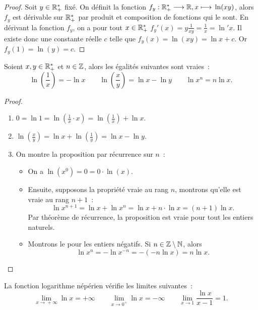 \begin{proof}
  Soit \(y \in \mathbb{R}_{+}^{*}\) fixé. On définit la fonction
  \(f_y:\mathbb{R}_{+}^{*} \longrightarrow{} \mathbb{R}, x \longmapsto{} \ln(xy)\), alors \(f_y\) est dérivable
  sur \(\mathbb{R}_{+}^{*}\) par produit et composition de fonctions qui le sont. En
  dérivant la fonction \(f_y\), on a pour tout \(x \in \mathbb{R}_{+}^{*}\) \(f_y'(x)
  = y \frac{1}{xy} = \frac{1}{x} = \ln' x\).
  Il existe donc une constante réelle \(c\) telle que \(f_y(x) = \ln(xy) = \ln x
  + c\). Or \(f_y(1) = \ln(y) = c\).
\end{proof}

\begin{corth}
  Soient \(x, y \in \mathbb{R}_{+}^{*}\) et \(n \in \mathbb{Z}\), alors les égalités suivantes
  sont vraies~:
  \begin{equation}
    \ln \left(\frac{1}{x}\right) = -\ln x \qquad \ln \left(\frac{x}{y}\right) =
    \ln x - \ln y \qquad \ln x^n = n\ln x.
  \end{equation}
\end{corth}

\begin{proof}
  \begin{enumerate}
    \item \( 0 = \ln 1 = \ln \left(\frac{1}{x} \cdot x \right) = \ln
      \left(\frac{1}{x}\right) + \ln x \).
    \item \( \ln \left(\frac{x}{y}\right) = \ln x + \ln \left(\frac{1}{y}\right)
      = \ln x - \ln y\).
    \item On montre la proposition par récurrence sur \(n\)~:
      \begin{itemize}
        \item On a \(\ln(x^0) = 0 = 0 \cdot \ln(x)\).
        \item Ensuite, supposons la propriété vraie au rang \(n\), montrons
          qu'elle est vraie au rang \(n+1\)~:
          \[\ln x^{n+1} = \ln x + \ln x^n = \ln x + n \cdot \ln x = (n+1) \ln
          x.\]                    Par théorème de récurrence, la proposition est
          vraie pour tout les entiers naturels.
        \item Montrons le pour les entiers négatifs. Si \(n \in \mathbb{Z}\setminus\mathbb{N}\),
          alors \[\ln x^n = -\ln x^{-n} = -(-n\ln x) = n\ln x.\]
      \end{itemize}
  \end{enumerate}
\end{proof}

\begin{theo}\label{theo:limln}
  La fonction logarithme népérien vérifie les limites suivantes~:
  \begin{equation}
    \lim\limits_{x \to{} + \infty}\ln{x} = +\infty\qquad\lim\limits_{x \to{}
    0^{+}} \ln{x} = -\infty\qquad\lim\limits_{x \to{} 1}\frac{\ln{x}}{x-1} = 1.
  \end{equation}
\end{theo}

